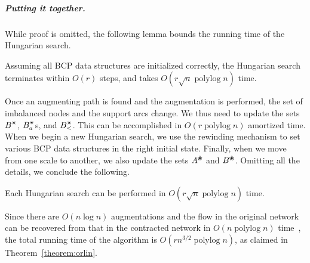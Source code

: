 \documentclass[a4paper,UKenglish]{socg-lipics-v2019}
\def\etal{\emph{et~al.}}
\def\etal{\textit{et~al.}}
\def\polylog{\mathop{\mathrm{polylog}}}
\def\alive#1{{#1}^\text{\ding{96}}}
\def\star{\text{\ding{84}}}
\theoremstyle{plain}
\numberwithin{figure}{section}
\renewcommand{\paragraph}{\subparagraph}
\begin{document}
\paragraph{Putting it together.}
While proof is omitted, the following lemma bounds the running time of the
Hungarian search.

\begin{lemma}
Assuming all BCP data structures are initialized correctly, the Hungarian search
terminates within $O(r)$ steps, and takes $O(r\sqrt{n}\polylog n)$ time.
\end{lemma}

Once an augmenting path is found and the augmentation is performed, the set of
imbalanced nodes and the support arcs change.
We thus need to update the sets $B^\star$, $B_a^\star$s, and $B_<^\star$.
This can be accomplished in $O(r\polylog n)$ amortized time.
When we begin a new Hungarian search, we use the rewinding mechanism
to set various BCP data structures in the right initial state.
Finally, when we move from one scale to another, we also update the sets
$\alive{A}$ and $\alive{B}$.
Omitting all the details, we conclude the following.

\begin{lemma}
Each Hungarian search can be performed in $O(r\sqrt{n}\polylog n)$ time.
\end{lemma}

Since there are $O(n\log n)$ augmentations and the flow in the original network
can be recovered from that in the contracted network in $O(n\polylog n)$
time~\cite{AFPVX17arxiv}, the total running time of the algorithm is
$O(rn^{3/2}\polylog n)$, as claimed in Theorem~\ref{theorem:orlin}.






\newpage
\appendix
\end{document}
